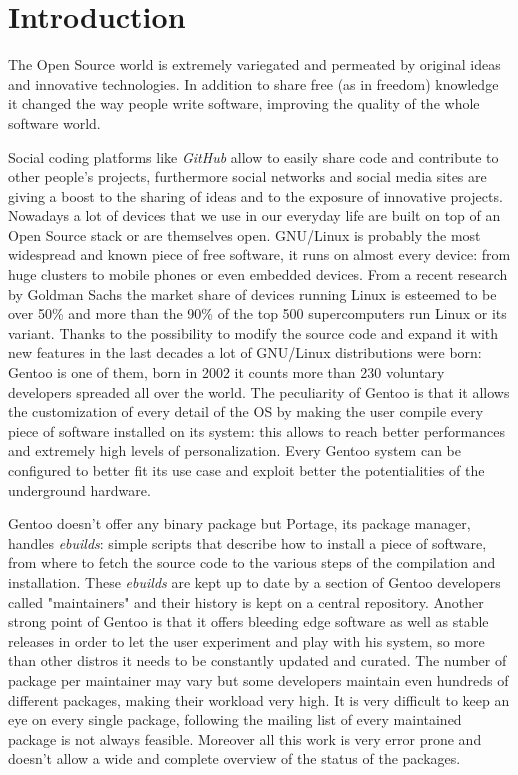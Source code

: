 \chapter{Introduction}

The Open Source world is extremely variegated and permeated by original ideas and innovative technologies. In addition to share free (as in freedom) knowledge it changed the way people write software, improving the quality of the whole software world.

Social coding platforms like \emph{GitHub} allow to easily share code and contribute to other people's projects, furthermore social networks and social media sites are giving a boost to the sharing of ideas and to the exposure of innovative projects.
Nowadays a lot of devices that we use in our everyday life are built on top of an Open Source stack or are themselves open. GNU/Linux is probably the most widespread and known piece of free software, it runs on almost every device: from huge clusters to mobile phones or even embedded devices. From a recent research by Goldman Sachs the market share of devices running Linux is esteemed to be over 50\%\cite{goldmansachs_microsoft} and more than the 90\% of the top 500 supercomputers run Linux or its variant\cite{top500}.
Thanks to the possibility to modify the source code and expand it with new features in the last decades a lot of GNU/Linux distributions were born: Gentoo is one of them, born in 2002 it counts more than 230 voluntary developers spreaded all over the world. The peculiarity of Gentoo is that it allows the customization of every detail of the OS by making the user compile every piece of software installed on its system: this allows to reach better performances and extremely high levels of personalization. Every Gentoo system can be configured to better fit its use case and exploit better the potentialities of the underground hardware.

Gentoo doesn't offer any binary package but Portage, its package manager, handles \emph{ebuilds}: simple scripts that describe how to install a piece of software, from where to fetch the source code to the various steps of the compilation and installation. These \emph{ebuilds} are kept up to date by a section of Gentoo developers called "maintainers" and their history is kept on a central repository. Another strong point of Gentoo is that it offers bleeding edge software as well as stable releases in order to let the user experiment and play with his system, so more than other distros it needs to be constantly updated and curated.
The number of package per maintainer may vary but some developers maintain even hundreds of different packages, making their workload very high. It is very difficult to keep an eye on every single package, following the mailing list of every maintained package is not always feasible. Moreover all this work is very error prone and doesn't allow a wide and complete overview of the status of the packages.

